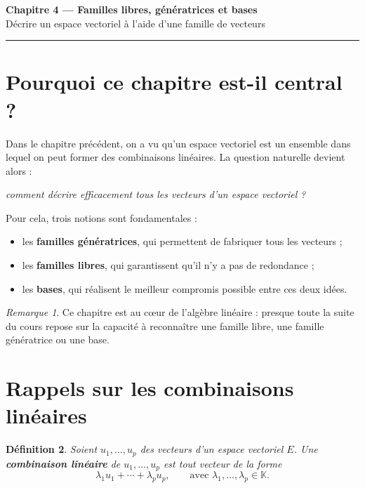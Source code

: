 \documentclass[11pt,a4paper]{article}
\newtheorem{definition}{Définition}[section]
\theoremstyle{remark}
\newtheorem{remarque}[definition]{Remarque}
\newcommand{\K}{\mathbb{K}}
\begin{document}
\begin{center}
    {\LARGE \textbf{Chapitre 4 --- Familles libres, génératrices et bases}}\\[0.5em]
    {\large Décrire un espace vectoriel à l’aide d’une famille de vecteurs}
\end{center}

\hrule
\vspace{1em}

\tableofcontents

\newpage

\section{Pourquoi ce chapitre est-il central ?}

Dans le chapitre précédent, on a vu qu’un espace vectoriel est un ensemble dans lequel on peut former des combinaisons linéaires. La question naturelle devient alors :

\begin{center}
\textit{comment décrire efficacement tous les vecteurs d’un espace vectoriel ?}
\end{center}

Pour cela, trois notions sont fondamentales :
\begin{itemize}
    \item les \textbf{familles génératrices}, qui permettent de fabriquer tous les vecteurs ;
    \item les \textbf{familles libres}, qui garantissent qu’il n’y a pas de redondance ;
    \item les \textbf{bases}, qui réalisent le meilleur compromis possible entre ces deux idées.
\end{itemize}

\begin{remarque}
Ce chapitre est au cœur de l’algèbre linéaire : presque toute la suite du cours repose sur la capacité à reconnaître une famille libre, une famille génératrice ou une base.
\end{remarque}

\section{Rappels sur les combinaisons linéaires}

\begin{definition}
Soient \(u_1,\dots,u_p\) des vecteurs d’un espace vectoriel \(E\).  
Une \textbf{combinaison linéaire} de \(u_1,\dots,u_p\) est tout vecteur de la forme
\[
\lambda_1u_1+\cdots+\lambda_pu_p,
\qquad
\text{avec } \lambda_1,\dots,\lambda_p\in\K.
\]
\end{definition}
\end{document}
